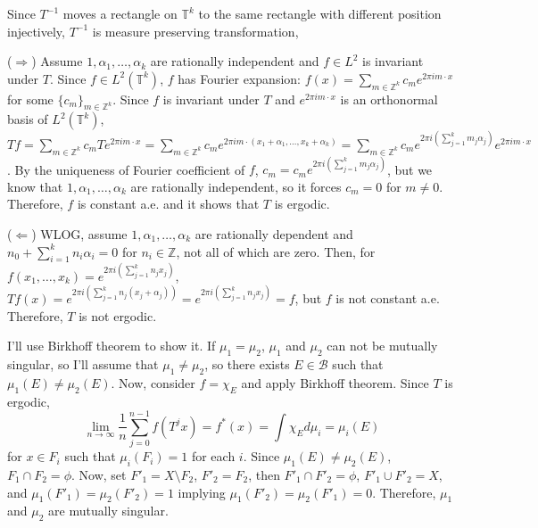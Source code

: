 \documentclass[12pt]{article}
\newenvironment{problem}[2][Problem]{\begin{trivlist}
\item[\hskip \labelsep {\bfseries #1}\hskip \labelsep {\bfseries #2.}]}{\end{trivlist}}
\begin{document}




\begin{problem}{1}
\end{problem}
Since $T^{-1}$ moves a rectangle on $\mathbb{T}^k$ to the same rectangle with different position injectively, $T^{-1}$ is measure preserving transformation,

($\Rightarrow$) Assume $1, \alpha_1, \ldots, \alpha_k$ are rationally independent and $f\in L^2$ is invariant under $T$. Since $f\in L^2(\mathbb{T}^k)$, $f$ has Fourier expansion: $f(x)=\sum\limits_{m\in \mathbb{Z}^k}c_m e^{2\pi i m\cdot x}$ for some $\{c_m\}_{m\in \mathbb{Z}^k}$. Since $f$ is invariant under $T$ and $e^{2\pi i m \cdot x}$ is an orthonormal basis of $L^2(\mathbb{T}^k)$, $Tf=\sum\limits_{m\in \mathbb{Z}^k}c_m Te^{2\pi i m\cdot x}=\sum\limits_{m\in \mathbb{Z}^k}c_m e^{2\pi i m\cdot (x_1+\alpha_1, \ldots, x_k+\alpha_k)}=\sum\limits_{m\in \mathbb{Z}^k}c_me^{2\pi i \left(\sum_{j=1}^k m_j \alpha_j\right) } e^{2\pi i m\cdot x}$. By the uniqueness of Fourier coefficient of $f$, $c_m=c_me^{2\pi i \left(\sum_{j=1}^k m_j \alpha_j\right) }$, but we know that $1, \alpha_1, \ldots, \alpha_k$ are rationally independent, so it forces $c_m=0$ for $m\neq 0$. Therefore, $f$ is constant a.e. and it shows that $T$ is ergodic.

($\Leftarrow$) WLOG, assume $1, \alpha_1, \ldots, \alpha_k$ are rationally dependent and $n_0+\sum\limits_{i=1}^k n_i \alpha_i=0$ for $n_i\in \mathbb{Z}$, not all of which are zero. Then, for $f(x_1, \ldots, x_k)=e^{2\pi i \left(\sum_{j=1}^k n_j x_j\right) }$, $Tf(x)=e^{2\pi i \left(\sum_{j=1}^k n_j (x_j+\alpha_j)\right)} = e^{2\pi i \left(\sum_{j=1}^k n_j x_j\right)}=f$, but $f$ is not constant a.e. Therefore, $T$ is not ergodic.



\begin{problem}{2}
\end{problem}
I'll use Birkhoff theorem to show it. If $\mu_1=\mu_2$, $\mu_1$ and $\mu_2$ can not be mutually singular, so I'll assume that $\mu_1\neq \mu_2$, so there exists $E\in \mathcal{B}$ such that $\mu_1(E)\neq \mu_2(E)$. Now, consider $f=\chi_E$ and apply Birkhoff theorem. Since $T$ is ergodic,
\begin{equation*}
    \lim\limits_{n\rightarrow \infty}\frac{1}{n}\sum\limits_{j=0}^{n-1} f(T^j x)=f^*(x)=\int \chi_E d\mu_i=\mu_i(E)
\end{equation*}
for $x\in F_i$ such that $\mu_i(F_i)=1$ for each $i$. Since $\mu_1(E)\neq \mu_2(E)$, $F_1\cap F_2=\phi$. Now, set $F'_1=X\setminus F_2$, $F'_2=F_2$, then $F'_1\cap F'_2=\phi$,  $F'_1\cup F'_2=X$, and $\mu_1(F'_1)=\mu_2(F'_2)=1$ implying $\mu_1(F'_2)=\mu_2(F'_1)=0$. Therefore, $\mu_1$ and $\mu_2$ are mutually singular.
\end{document}
